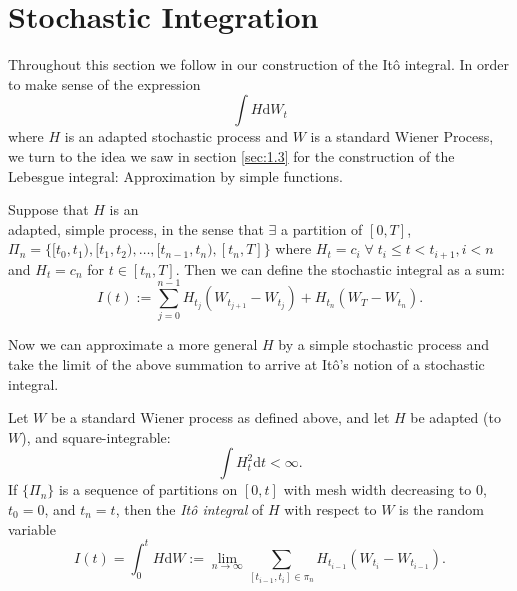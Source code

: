\section{Stochastic Integration}\label{sec:1.5}

Throughout this section we follow \textcite{SCfFII} in our construction of the It\^{o} 
integral. In order to make sense of the expression 
\begin{equation*}
    \int H\mathrm dW_t
\end{equation*}
where $H$ is an adapted stochastic process and $W$ is a standard Wiener Process, 
we turn to the idea we saw in section \ref{sec:1.3}
for the construction of the Lebesgue integral: Approximation by simple functions.

\begin{definition}
    Suppose that $H$ is an\\ adapted, simple process, in the sense that $\exists$ a 
    partition of $[0,T]$, \\$\Pi_n=\{[t_0,t_1),[t_1,t_2),\dots,[t_{n-1},t_n),[t_n,T]\}$ where 
    $H_t=c_i\;\forall\;t_i\leq t<t_{i+1}, i < n$ and $H_t=c_n$ for $t\in[t_n,T]$.
    Then we can define the stochastic integral as a sum:
    \begin{equation}
        I(t):=\sum_{j=0}^{n-1}H_{t_j}(W_{t_{j+1}}-W_{t_j})+H_{t_n}(W_T-W_{t_n}).
    \end{equation}     
\end{definition}

Now we can approximate a more general $H$ by a simple stochastic process and 
take the limit of the above summation to arrive at It\^{o}'s notion of a stochastic 
integral.

\begin{definition}
    Let $W$ be a standard Wiener process as defined above, and let $H$ be adapted 
    (to $W$), and square-integrable:
    \begin{equation*}
        \int H_t^2\mathrm dt<\infty.
    \end{equation*}
    If $\{\Pi_n\}$ is a sequence of partitions on $[0,t]$ with mesh width decreasing
    to $0$, $t_0=0$, and $t_n=t$, then the \emph{It\^{o} integral} of $H$
    with respect to $W$ is the random variable
    \begin{equation}
        I(t)=\int_0^tH\mathrm dW:=\lim_{n\rightarrow\infty}\sum_{[t_{i-1},t_i]\in\pi_n}H_{t_{i-1}}(W_{t_i}-W_{t_{i-1}}).
    \end{equation}
\end{definition}

